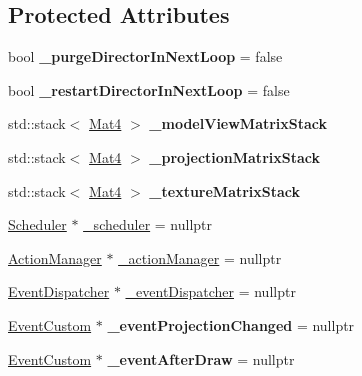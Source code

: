 \subsection*{Protected Attributes}
\begin{DoxyCompactItemize}
\item 
\mbox{\label{classDirector_a8d161eab56d74138b14daba888b24aaf}} 
bool {\bfseries \+\_\+purge\+Director\+In\+Next\+Loop} = false
\item 
\mbox{\label{classDirector_a3f49d039d9f1b74e1385273f688b4922}} 
bool {\bfseries \+\_\+restart\+Director\+In\+Next\+Loop} = false
\item 
\mbox{\label{classDirector_ac85888229b82b0f4febf9b53820ab529}} 
std\+::stack$<$ \hyperlink{classMat4}{Mat4} $>$ {\bfseries \+\_\+model\+View\+Matrix\+Stack}
\item 
\mbox{\label{classDirector_aa407747aaecd16737bb06058697a9a6c}} 
std\+::stack$<$ \hyperlink{classMat4}{Mat4} $>$ {\bfseries \+\_\+projection\+Matrix\+Stack}
\item 
\mbox{\label{classDirector_aa38e02847c51fb46991a78333bf7e8e0}} 
std\+::stack$<$ \hyperlink{classMat4}{Mat4} $>$ {\bfseries \+\_\+texture\+Matrix\+Stack}
\item 
\hyperlink{classScheduler}{Scheduler} $\ast$ \hyperlink{classDirector_a11abf6c355682cf63df2f3b1f610fe33}{\+\_\+scheduler} = nullptr
\item 
\hyperlink{classActionManager}{Action\+Manager} $\ast$ \hyperlink{classDirector_a0c57c42ef4fa57d55d6d6a5e2cf9d92a}{\+\_\+action\+Manager} = nullptr
\item 
\hyperlink{classEventDispatcher}{Event\+Dispatcher} $\ast$ \hyperlink{classDirector_a692fa8b03378f2c8f01133355fcaeb7b}{\+\_\+event\+Dispatcher} = nullptr
\item 
\mbox{\label{classDirector_a759bdd862d980eb2684c339a74c8ddc2}} 
\hyperlink{classEventCustom}{Event\+Custom} $\ast$ {\bfseries \+\_\+event\+Projection\+Changed} = nullptr
\item 
\mbox{\label{classDirector_a98fcbb95a6cfc2541f559bdd34cc9aee}} 
\hyperlink{classEventCustom}{Event\+Custom} $\ast$ {\bfseries \+\_\+event\+After\+Draw} = nullptr

\end{DoxyCompactItemize}
